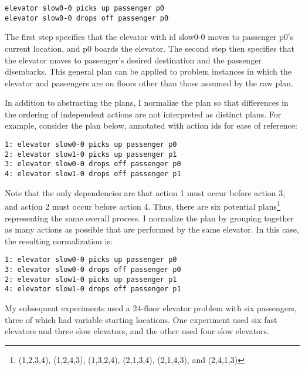 \begin{verbatim}
elevator slow0-0 picks up passenger p0
elevator slow0-0 drops off passenger p0
\end{verbatim}

The first step specifies that the elevator with id slow0-0 moves to passenger p0's current location, and p0 boards the elevator.  The second step then specifies that the elevator moves to passenger's desired destination and the passenger disembarks.  This general plan can  be applied to problem instances in which the elevator and passengers are on floors other than those assumed by the raw plan.

In addition to abstracting the plans, I normalize the plan so that differences in the ordering of independent actions are not interpreted as distinct plans.  For example, consider the plan below, annotated with action ids for ease of reference: 

\begin{verbatim}
1: elevator slow0-0 picks up passenger p0
2: elevator slow1-0 picks up passenger p1
3: elevator slow0-0 drops off passenger p0
4: elevator slow1-0 drops off passenger p1
\end{verbatim}

Note that the only dependencies are that action 1 must occur before action 3, and action 2 must occur before action 4.  Thus, there are six potential plans\footnote{(1,2,3,4), (1,2,4,3), (1,3,2,4), (2,1,3,4), (2,1,4,3), and (2,4,1,3)} representing the same overall process.  I normalize the plan by grouping together as many actions as possible that are performed by the same elevator.  In this case, the resulting normalization is:

\begin{verbatim}
1: elevator slow0-0 picks up passenger p0
3: elevator slow0-0 drops off passenger p0
2: elevator slow1-0 picks up passenger p1
4: elevator slow1-0 drops off passenger p1
\end{verbatim}

My subsequent experiments used a 24-floor elevator problem with six passengers, three of which had variable starting locations.  One experiment used six fast elevators and three slow elevators, and the other used four slow elevators.

